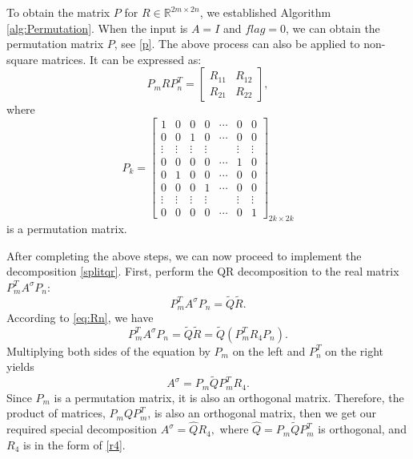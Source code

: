 \documentclass[1p]{elsarticle}
\numberwithin{equation}{section}
\begin{document}
To obtain the matrix $P$ for $R \in \mathbb{R}^{2m \times 2n}$, we established Algorithm \ref{alg:Permutation}. When the input is $A=I$ and $flag=0$, we can obtain the permutation matrix $P$, see \eqref{p}. The above process can also be applied to non-square matrices. It can be expressed as:
\begin{equation}
    P_{m} R P_{n}^T = \begin{bmatrix} R_{11} & R_{12}\\R_{21}& R_{22}\end{bmatrix},\label{eq:Rn}
\end{equation}
where
\begin{equation}\label{p}
    P_k = \begin{bmatrix} 
            1 & 0 & 0 & 0 & \cdots & 0 & 0\\ 
            0 & 0 & 1 & 0 & \cdots & 0 & 0\\ 
            \vdots & \vdots & \vdots & \vdots &  & \vdots & \vdots\\ 
            0 & 0 & 0 & 0 & \cdots & 1 & 0 \\
            0 & 1 & 0 & 0 & \cdots & 0 & 0\\ 
            0 & 0 & 0 & 1 & \cdots & 0 & 0\\ 
            \vdots & \vdots & \vdots & \vdots &  & \vdots & \vdots\\ 
            0 & 0 & 0 & 0 &\cdots & 0 & 1 
        \end{bmatrix}_{2k \times 2k}
\end{equation}
is a permutation matrix.

After completing the above steps, we can now proceed to implement the decomposition \eqref{splitqr}.
First, perform the QR decomposition to the real matrix $P_m^TA^\sigma P_{n}$:
\[P_m^TA^\sigma P_n = \tilde{Q}\tilde{R}.\]
According to \eqref{eq:Rn}, we have
\[P_m^TA^\sigma P_n = \tilde{Q}\tilde{R} = \tilde{Q}(P_m^TR_4P_n).\]
Multiplying both sides of the equation by $P_m$ on the left and $P_n^T$ on the right yields
\[A^\sigma=P_m\tilde{Q}P_m^T R_4.\]
Since $P_m$ is a permutation matrix, it is also an orthogonal matrix. Therefore, the product of matrices, $P_mQP_m^T$, is also an orthogonal matrix, then we get our required special decomposition $A^\sigma=\hat{Q}R_4,$ where $\hat{Q}=P_m\tilde{Q}P_m^T$ is orthogonal, and $R_4$ is in the form of \eqref{r4}.
\end{document}

